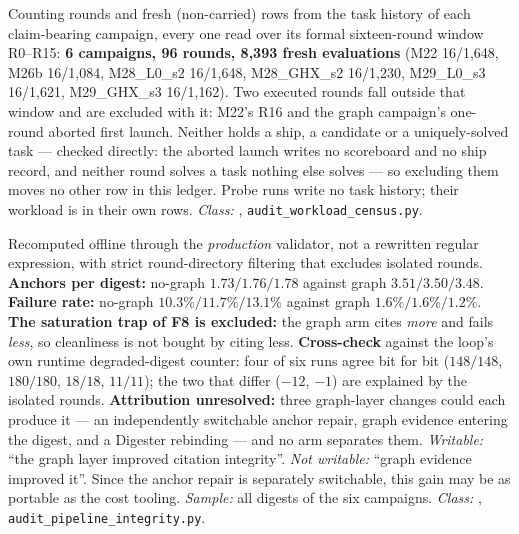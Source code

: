 \begin{description}[leftmargin=0pt,style=nextline,font=\normalfont,itemsep=6pt]
\item[\textbf{F51}\quad The size of the evidence base.]
Counting rounds and fresh (non-carried) rows from the task history of each
claim-bearing campaign, every one read over its formal sixteen-round window
R0--R15: \textbf{6 campaigns, 96 rounds, 8{,}393 fresh evaluations}
(M22 16/1{,}648, M26b 16/1{,}084, M28\_L0\_s2 16/1{,}648,
M28\_GHX\_s2 16/1{,}230, M29\_L0\_s3 16/1{,}621, M29\_GHX\_s3 16/1{,}162).
Two executed rounds fall outside that window and are excluded with it:
M22's R16 and the graph campaign's one-round aborted first launch. Neither
holds a ship, a candidate or a uniquely-solved task --- checked directly:
the aborted launch writes no scoreboard and no ship record, and neither
round solves a task nothing else solves --- so excluding them moves no
other row in this ledger.
Probe runs write no task history; their workload is in their own rows.
\emph{Class:} , \texttt{audit\_workload\_census.py}.

\item[\textbf{F52}\quad Citation integrity.]
Recomputed offline through the \emph{production} validator, not a rewritten
regular expression, with strict round-directory filtering that excludes
isolated rounds. \textbf{Anchors per digest:} no-graph $1.73/1.76/1.78$
against graph $\mathbf{3.51/3.50/3.48}$. \textbf{Failure rate:} no-graph
$10.3\%/11.7\%/13.1\%$ against graph $\mathbf{1.6\%/1.6\%/1.2\%}$.
\textbf{The saturation trap of F8 is excluded:} the graph arm cites
\emph{more} and fails \emph{less}, so cleanliness is not bought by citing
less. \textbf{Cross-check} against the loop's own runtime degraded-digest
counter: four of six runs agree bit for bit ($148/148$, $180/180$, $18/18$,
$11/11$); the two that differ ($-12$, $-1$) are explained by the isolated
rounds. \textbf{Attribution unresolved:} three graph-layer changes could
each produce it --- an independently switchable anchor repair, graph
evidence entering the digest, and a Digester rebinding --- and no arm
separates them. \emph{Writable:} ``the graph layer improved citation
integrity''. \emph{Not writable:} ``graph evidence improved it''. Since
the anchor repair is separately switchable, this gain may be as portable as
the cost tooling. \emph{Sample:} all digests of the six campaigns.
\emph{Class:} , \texttt{audit\_pipeline\_integrity.py}.


\end{description}
